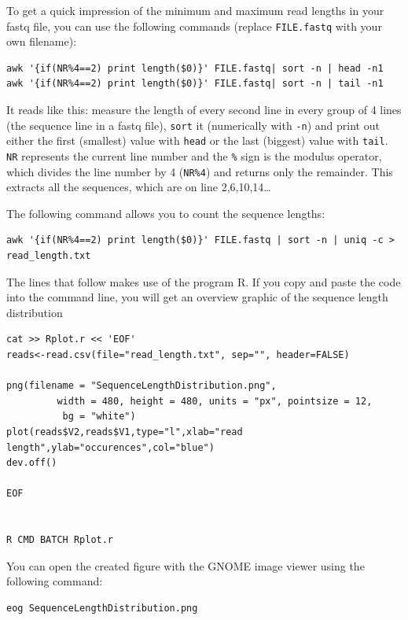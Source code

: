 \documentclass[11pt]{article}
\begin{document}
To get a quick impression of the minimum and maximum read lengths in
your fastq file, you can use the following commands (replace
\texttt{FILE.fastq} with your own filename):

\begin{verbatim}
awk '{if(NR%4==2) print length($0)}' FILE.fastq| sort -n | head -n1
awk '{if(NR%4==2) print length($0)}' FILE.fastq| sort -n | tail -n1
\end{verbatim}

It reads like this: measure the length of every second line in every
group of 4 lines (the sequence line in a fastq file), \texttt{sort} it
(numerically with \texttt{-n}) and print out either the first (smallest)
value with \texttt{head} or the last (biggest) value with \texttt{tail}. \texttt{NR}
represents the current line number and the \texttt{\%} sign is the modulus
operator, which divides the line number by 4 (\texttt{NR\%4}) and returns only
the remainder. This extracts all the sequences, which are on line
2,6,10,14\ldots{}


The following command allows you to count the sequence lengths:

\begin{verbatim}
awk '{if(NR%4==2) print length($0)}' FILE.fastq | sort -n | uniq -c > read_length.txt
\end{verbatim}

The lines that follow makes use of the program R. If you copy and
paste the code into the command line, you will get an overview graphic
of the sequence length distribution 

\begin{verbatim}
cat >> Rplot.r << 'EOF'
reads<-read.csv(file="read_length.txt", sep="", header=FALSE)

png(filename = "SequenceLengthDistribution.png",
         width = 480, height = 480, units = "px", pointsize = 12,
          bg = "white")
plot(reads$V2,reads$V1,type="l",xlab="read length",ylab="occurences",col="blue")
dev.off()

EOF


R CMD BATCH Rplot.r
\end{verbatim}

You can open the created figure with the GNOME image viewer using the
following command:

\begin{verbatim}
eog SequenceLengthDistribution.png
\end{verbatim}
\end{document}
